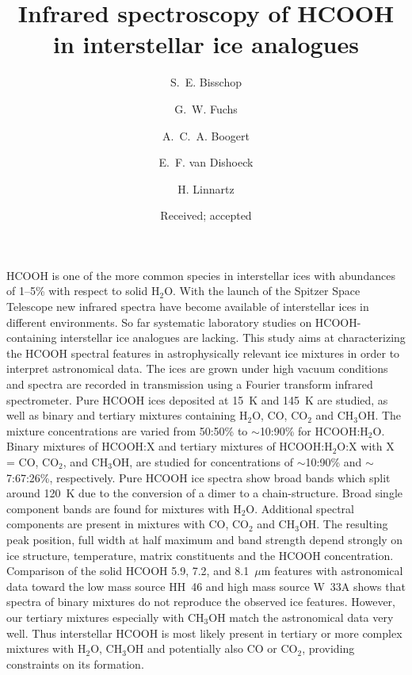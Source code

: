 \documentclass{aa}
\begin{document}
%
   \title{Infrared spectroscopy of HCOOH in interstellar ice analogues}

   \subtitle{}

   \author{S.~E. Bisschop  \and G.~W. Fuchs  \and
A.~C.~A. Boogert  \and E.~F. van Dishoeck \and
H. Linnartz}



   \date{Received; accepted}

 
  \abstract
   {HCOOH is one of the more common species in interstellar ices with abundances of 1--5\% with respect to solid H$_2$O. With the launch of the Spitzer Space Telescope new infrared spectra have become available of interstellar ices in different environments. So far systematic laboratory studies on HCOOH-containing interstellar ice analogues are lacking. }
   {This study aims at characterizing the HCOOH spectral features in astrophysically relevant ice mixtures in order to interpret astronomical data.}
   {The ices are grown under high vacuum conditions and spectra are recorded in transmission using a Fourier transform infrared spectrometer. Pure HCOOH ices deposited at 15~K and 145~K are studied, as well as binary and tertiary mixtures containing H$_2$O, CO, CO$_2$ and CH$_3$OH. The mixture concentrations are varied from 50:50\% to $\sim$10:90\% for HCOOH:H$_2$O. Binary mixtures of HCOOH:X and tertiary mixtures of HCOOH:H$_2$O:X with X = CO, CO$_2$, and CH$_3$OH, are studied for concentrations of $\sim$10:90\% and $\sim$7:67:26\%, respectively.}
   {Pure HCOOH ice spectra show broad bands which split around 120~K due to the conversion of a dimer to a chain-structure. Broad single component bands are found for mixtures with H$_2$O. Additional spectral components are present in mixtures with CO, CO$_2$ and CH$_3$OH. The resulting peak position, full width at half maximum and band strength depend strongly on ice structure, temperature, matrix constituents and the HCOOH concentration. Comparison of the solid HCOOH 5.9, 7.2, and 8.1~$\mu$m features with astronomical data toward the low mass source HH~46 and high mass source W~33A shows that spectra of binary mixtures do not reproduce the observed ice features. However, our tertiary mixtures especially with CH$_3$OH match the astronomical data very well. Thus interstellar HCOOH is most likely present in tertiary or more complex mixtures with H$_2$O, CH$_3$OH and potentially also CO or CO$_2$, providing constraints on its formation.}
   {}
\end{document}
